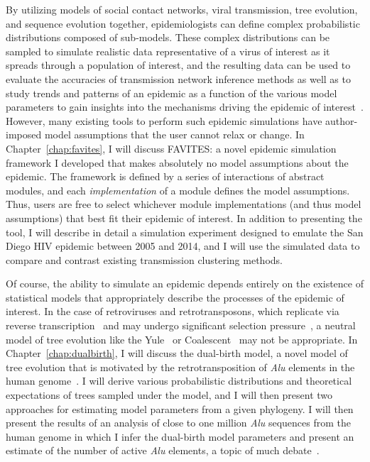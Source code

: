 By utilizing models of social contact networks, viral transmission, tree evolution, and sequence evolution together, epidemiologists can define complex probabilistic distributions composed of sub-models. These complex distributions can be sampled to simulate realistic data representative of a virus of interest as it spreads through a population of interest, and the resulting data can be used to evaluate the accuracies of transmission network inference methods as well as to study trends and patterns of an epidemic as a function of the various model parameters to gain insights into the mechanisms driving the epidemic of interest~\cite{Ratmann2017}. However, many existing tools to perform such epidemic simulations have author-imposed model assumptions that the user cannot relax or change. In Chapter~\ref{chap:favites}, I will discuss FAVITES: a novel epidemic simulation framework I developed that makes absolutely no model assumptions about the epidemic. The framework is defined by a series of interactions of abstract modules, and each \textit{implementation} of a module defines the model assumptions. Thus, users are free to select whichever module implementations (and thus model assumptions) that best fit their epidemic of interest. In addition to presenting the tool, I will describe in detail a simulation experiment designed to emulate the San Diego \gls{HIV} epidemic between 2005 and 2014, and I will use the simulated data to compare and contrast existing transmission clustering methods.

Of course, the ability to simulate an epidemic depends entirely on the existence of statistical models that appropriately describe the processes of the epidemic of interest. In the case of retroviruses and retrotransposons, which replicate via reverse transcription~\cite{Whitcomb1992} and may undergo significant selection pressure~\cite{Wood2009}, a neutral model of tree evolution like the Yule~\cite{Yule1925} or Coalescent~\cite{Kingman1982} may not be appropriate. In Chapter~\ref{chap:dualbirth}, I will discuss the dual-birth model, a novel model of tree evolution that is motivated by the retrotransposition of \textit{Alu} elements in the human genome~\cite{Batzer2002}. I will derive various probabilistic distributions and theoretical expectations of trees sampled under the model, and I will then present two approaches for estimating model parameters from a given phylogeny. I will then present the results of an analysis of close to one million \textit{Alu} sequences from the human genome in which I infer the dual-birth model parameters and present an estimate of the number of active \textit{Alu} elements, a topic of much debate~\cite{Price2004,Deininger2011,Cordaux2004}.

